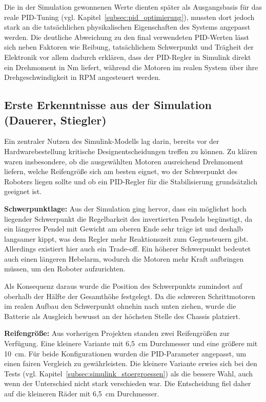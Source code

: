 \documentclass[fontsize=12pt,
parskip=half,	%
department=FakM,  %
logostyle=flat,
twoside, %
DIV=15,BCOR=10mm, %
]{OTHRreprt}
\begin{document}
Die in der Simulation gewonnenen Werte dienten später als Ausgangsbasis für das reale PID-Tuning (vgl. Kapitel~\ref{subsec:pid_optimierung}), mussten dort jedoch stark an die tatsächlichen physikalischen Eigenschaften des Systems angepasst werden.
Die deutliche Abweichung zu den final verwendeten PID-Werten lässt sich neben Faktoren wie Reibung, tatsächlichem Schwerpunkt und Trägheit der Elektronik vor allem dadurch erklären, dass der PID-Regler in Simulink direkt ein Drehmoment in Nm liefert, während die Motoren im realen System über ihre Drehgeschwindigkeit in RPM angesteuert werden.


\subsection{Erste Erkenntnisse aus der Simulation (Dauerer, Stiegler)}
\label{subsec:simulink_dimensionierung}

Ein zentraler Nutzen des Simulink-Modells lag darin, bereits vor der Hardwarebestellung kritische Designentscheidungen treffen zu können. Zu klären waren insbesondere, ob die ausgewählten Motoren ausreichend Drehmoment liefern, welche Reifengröße sich am besten eignet, wo der Schwerpunkt des Roboters liegen sollte und ob ein PID-Regler für die Stabilisierung grundsätzlich geeignet ist.

\textbf{Schwerpunktlage:} Aus der Simulation ging hervor, dass ein möglichst hoch liegender Schwerpunkt die Regelbarkeit des invertierten Pendels begünstigt, da ein längeres Pendel mit Gewicht am oberen Ende sehr träge ist und deshalb langsamer kippt, was dem Regler mehr Reaktionszeit zum Gegensteuern gibt. Allerdings existiert hier auch ein Trade-off. Ein höherer Schwerpunkt bedeutet auch einen längeren Hebelarm, wodurch die Motoren mehr Kraft aufbringen müssen, um den Roboter aufzurichten.

Als Konsequenz daraus wurde die Position des Schwerpunkts zumindest auf oberhalb der Hälfte der Gesamthöhe festgelegt. Da die schweren Schrittmotoren im realen Aufbau den Schwerpunkt ohnehin nach unten ziehen, wurde die Batterie als Ausgleich bewusst an der höchsten Stelle des Chassis platziert.

\textbf{Reifengröße:} Aus vorherigen Projekten standen zwei Reifengrößen zur Verfügung. Eine kleinere Variante mit 6,5~cm Durchmesser und eine größere mit 10~cm. Für beide Kon\-fi\-gu\-ra\-tio\-nen wurden die PID-Parameter angepasst, um einen fairen Vergleich zu gewährleisten. Die kleinere Variante erwies sich bei den Tests (vgl. Kapitel~\ref{subsec:simulink_stoergroessen}) als die bessere Wahl, auch wenn der Unterschied nicht stark verschieden war. Die Entscheidung fiel daher auf die kleineren Räder mit 6,5~cm Durchmesser.
\end{document}
